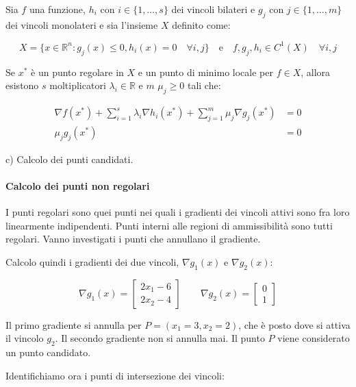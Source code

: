 \documentclass[\main/main.tex]{subfiles}
\begin{document}
\begin{theorem}
	Sia $f$ una funzione, $h_i \text{ con } i \in \{1, \ldots, s\}$ dei vincoli bilateri e $g_j \text{ con } j \in \{1, \ldots, m\}$ dei vincoli monolateri e sia l'insieme $X$ definito come:

	\[
		X  = \{x \in \mathbb{R}^n: g_j(x) \leq 0, h_i(x) = 0 \quad \forall i, j \} \quad \text{e} \quad f, g_j, h_i \in C^1(X) \quad \forall i,j
	\]

	Se $x^*$ è un punto regolare in $X$ e un punto di minimo locale per $f \in X$, allora esistono $s$ moltiplicatori $\lambda_i \in \mathbb{R}$ e $m$ $\mu_j \geq 0$ tali che:

	\begin{align*}
		\nabla f(x^*) + \sum_{i=1}^s \lambda_i \nabla h_i(x^*) + \sum_{j=1}^m \mu_j \nabla g_j(x^*) & = 0 \\
		\mu_j g_j(x^*)                                                                              & = 0
	\end{align*}
\end{theorem}

c) Calcolo dei punti candidati.

\paragraph*{Calcolo dei punti non regolari}
I punti regolari sono quei punti nei quali i gradienti dei vincoli attivi sono fra loro linearmente indipendenti. Punti interni alle regioni di ammissibilità sono tutti regolari. Vanno investigati i punti che annullano il gradiente.

Calcolo quindi i gradienti dei due vincoli, $\nabla g_1(x)$ e $\nabla g_2(x)$:

\[
	\nabla g_1(x) = \begin{bmatrix}
		2x_1 -6 \\
		2x_2 -4
	\end{bmatrix}
	\qquad
	\nabla g_2(x) = \begin{bmatrix}
		0 \\
		1
	\end{bmatrix}
\]

Il primo gradiente si annulla per $P = (x_1 = 3, x_2 = 2)$, che è posto dove si attiva il vincolo $g_2$. Il secondo gradiente non si annulla mai. Il punto $P$ viene considerato un punto candidato.

Identifichiamo ora i punti di intersezione dei vincoli:
\end{document}
